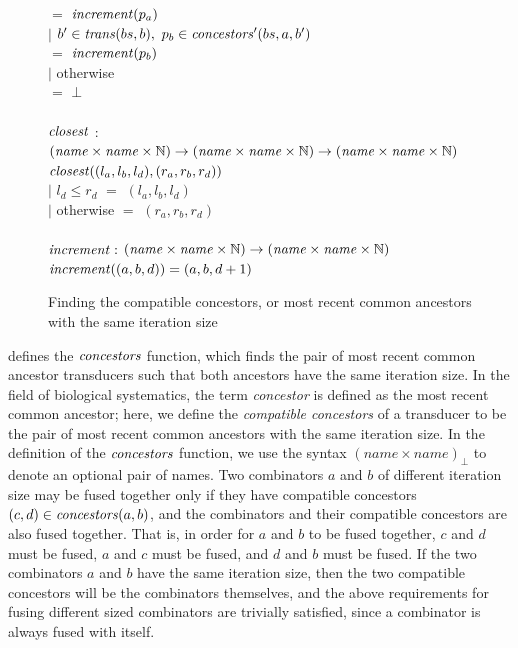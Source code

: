 \begin{figure}
\begin{tabbing}
        \>     \>                      \> $=$ \> $\mathit{increment}(p_a)$ \\
        \> $|$ \> $b' \in \mathit{trans}(bs,b),~ p_b \in \mathit{concestors}'(bs,a,b')$ \\
        \>     \>                      \> $=$ \> $\mathit{increment}(p_b)$ \\
        \> $|$ \> otherwise            \\
        \>     \>                      \> $=$    \> $\bot$
\\
\\
$\mathit{closest}$ \> $:$ \> $(\mathit{name} \times \mathit{name} \times \mathbb{N}) \to (\mathit{name} \times \mathit{name} \times \mathbb{N}) \to (\mathit{name} \times \mathit{name} \times \mathbb{N})$ \\
$\mathit{closest}((l_a,l_b,l_d), (r_a,r_b,r_d))$ \\
        \> $|$ \> $l_d \le r_d$ \> \> \> $=$ \> $(l_a,l_b,l_d)$ \\
        \> $|$ \> otherwise     \> \> \> $=$ \> $(r_a,r_b,r_d)$ \\
\\
$\mathit{increment} :$ \> \> $(\mathit{name} \times \mathit{name} \times \mathbb{N}) \to (\mathit{name} \times \mathit{name} \times \mathbb{N})$ \\
$\mathit{increment}((a,b,d)) = (a,b,d+1)$ \\
\end{tabbing}

\caption{Finding the compatible concestors, or most recent common ancestors with the same iteration size}
\label{fig:clustering:concestors}
\end{figure}

 defines the $\mathit{concestors}$ function, which finds the pair of most recent common ancestor transducers such that both ancestors have the same iteration size.
In the field of biological systematics, the term \emph{concestor} is defined as the most recent common ancestor; here, we define the \emph{compatible concestors} of a transducer to be the pair of most recent common ancestors with the same iteration size.
In the definition of the $\mathit{concestors}$ function, we use the syntax $(name \times name)_\bot$ to denote an optional pair of names.
Two combinators $a$ and $b$ of different iteration size may be fused together only if they have compatible concestors $(c, d) \in \mathit{concestors}(a,b)$, and the combinators and their compatible concestors are also fused together.
That is, in order for $a$ and $b$ to be fused together, $c$ and $d$ must be fused, $a$ and $c$ must be fused, and $d$ and $b$ must be fused.
If the two combinators $a$ and $b$ have the same iteration size, then the two compatible concestors will be the combinators themselves, and the above requirements for fusing different sized combinators are trivially satisfied, since a combinator is always fused with itself.

